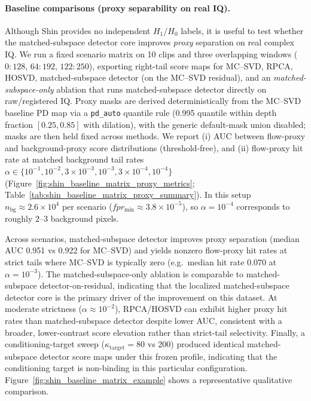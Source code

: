 \paragraph{Baseline comparisons (proxy separability on real IQ).}
Although Shin provides no independent $H_1/H_0$ labels, it is useful to test whether the matched-subspace detector core improves \emph{proxy} separation on real complex IQ.
We run a fixed scenario matrix on 10 clips and three overlapping windows ($0{:}128$, $64{:}192$, $122{:}250$), exporting right-tail score maps for MC--SVD, RPCA, HOSVD, matched-subspace detector (on the MC--SVD residual), and an \emph{matched-subspace-only} ablation that runs matched-subspace detector directly on raw/registered IQ.
Proxy masks are derived deterministically from the MC--SVD baseline PD map via a \texttt{pd\_auto} quantile rule (0.995 quantile within depth fraction $[0.25,0.85]$ with dilation), with the generic default-mask union disabled; masks are then held fixed across methods.
We report (i) AUC between flow-proxy and background-proxy score distributions (threshold-free), and (ii) flow-proxy hit rate at matched background tail rates $\alpha\in\{10^{-1},10^{-2},3\times 10^{-3},10^{-3},3\times 10^{-4},10^{-4}\}$ (Figure~\ref{fig:shin_baseline_matrix_proxy_metrics}; Table~\ref{tab:shin_baseline_matrix_proxy_summary}).
In this setup $n_{\mathrm{bg}}\approx 2.6\times 10^4$ per scenario ($fpr_{\min}\approx 3.8\times 10^{-5}$), so $\alpha=10^{-4}$ corresponds to roughly $2$--$3$ background pixels.

Across scenarios, matched-subspace detector improves proxy separation (median AUC 0.951 vs 0.922 for MC--SVD) and yields nonzero flow-proxy hit rates at strict tails where MC--SVD is typically zero (e.g.\ median hit rate 0.070 at $\alpha=10^{-3}$).
The matched-subspace-only ablation is comparable to matched-subspace detector-on-residual, indicating that the localized matched-subspace detector core is the primary driver of the improvement on this dataset.
At moderate strictness ($\alpha\approx 10^{-2}$), RPCA/HOSVD can exhibit higher proxy hit rates than matched-subspace detector despite lower AUC, consistent with a broader, lower-contrast score elevation rather than strict-tail selectivity.
Finally, a conditioning-target sweep ($\kappa_{\mathrm{target}}=80$ vs 200) produced identical matched-subspace detector score maps under this frozen profile, indicating that the conditioning target is non-binding in this particular configuration.
Figure~\ref{fig:shin_baseline_matrix_example} shows a representative qualitative comparison.

